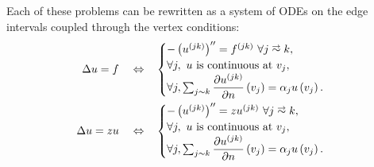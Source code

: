 Each of these problems can be rewritten as a system of ODEs on the edge intervals coupled through the vertex conditions:
\begin{align*}
	\laplacian u = f \quad\Leftrightarrow\quad &
	\begin{cases}
		-\bracs{u^{(jk)}}'' = f^{(jk)} \ \forall j\conLeft k, \\
		\forall j, \ u \text{ is continuous at } v_j, \\
		\forall j, \sum_{j\con k}\pdiff{u^{(jk)}}{n}\bracs{v_j} = \alpha_j u\bracs{v_j}.
	\end{cases} \\
	\laplacian u = z u \quad\Leftrightarrow\quad &
	\begin{cases}
		-\bracs{u^{(jk)}}'' = z u^{(jk)} \ \forall j\conLeft k, \\
		\forall j, \ u \text{ is continuous at } v_j, \\
		\forall j, \sum_{j\con k}\pdiff{u^{(jk)}}{n}\bracs{v_j} = \alpha_j u\bracs{v_j}.
	\end{cases}
\end{align*}
